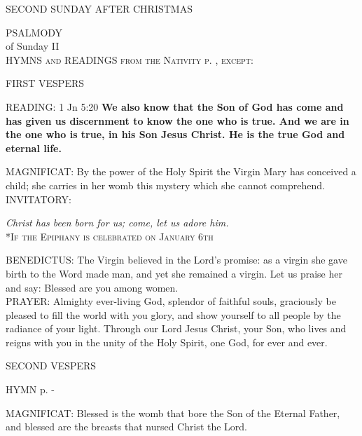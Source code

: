 \begin{center}SECOND SUNDAY AFTER CHRISTMAS\\\end{center}

\noindent\small{\uppercase{PSALMODY}\\} of Sunday II\\
\textsc{HYMNS and READINGS from the Nativity p. \pageref{christmas:nativity1stVespers}, except:}

\begin{flushleft}\normalsize{\uppercase{FIRST VESPERS\\}}\end{flushleft}

\noindent\small{\uppercase{READING:}}    1 Jn 5:20 \textbf{    We also know that the Son of God has come and has given us discernment to know the one who is true. And we are in the one who is true, in his Son Jesus Christ. He is the true God and eternal life.\\}

\noindent\small{\uppercase{MAGNIFICAT:}}	By the power of the Holy Spirit the Virgin Mary has conceived a child; she carries in her womb this mystery which she cannot comprehend.\\

\noindent\small{\uppercase{INVITATORY:}}\normalsize
\begin{center}
\textit{Christ has been born for us; come, let us adore him.\\}
\tiny\textsc{*If the Epiphany is celebrated on January 6th\\}
\end{center}
\noindent\small{\uppercase{BENEDICTUS:}}	The Virgin believed in the Lord's promise: as a virgin she gave birth to the Word made man, and yet she remained a virgin. Let us praise her and say: Blessed are you among women.\\

\noindent\small{\uppercase{PRAYER:}}	Almighty ever-living God, splendor of faithful souls, graciously be pleased to fill the world with you glory, and show yourself to all people by the radiance of your light. Through our Lord Jesus Christ, your Son, who lives and reigns with you in the unity of the Holy Spirit, one God, for ever and ever.

\begin{flushleft}\normalsize{\uppercase{SECOND VESPERS\\}}\end{flushleft}
\small{\uppercase{HYMN} p. \pageref{christmas:firstHymn}-\pageref{christmas:lastHymn}\\}

\noindent\small{\uppercase{MAGNIFICAT:}}	Blessed is the womb that bore the Son of the Eternal Father, and blessed are the breasts that nursed Christ the Lord.\\
